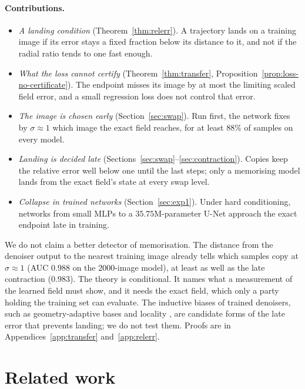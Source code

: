 \documentclass{article} %
\theoremstyle{plain}
\theoremstyle{definition}
\theoremstyle{remark}
\begin{document}
\paragraph{Contributions.}
\begin{itemize}\itemsep1pt
\item \emph{A landing condition} (Theorem~\ref{thm:relerr}). A trajectory lands on a training image
  if its error stays a fixed fraction below its distance to it, and not if the radial ratio tends
  to one fast enough.
\item \emph{What the loss cannot certify} (Theorem~\ref{thm:transfer},
  Proposition~\ref{prop:loss-no-certificate}). The endpoint misses its image by at most the
  limiting scaled field error, and a small regression loss does not control that error.
\item \emph{The image is chosen early} (Section~\ref{sec:swap}). Run first, the network fixes by
  $\sigma\approx1$ which image the exact field reaches, for at least $88\%$ of samples on every model.
\item \emph{Landing is decided late} (Sections~\ref{sec:swap}--\ref{sec:contraction}). Copies keep
  the relative error well below one until the last steps; only a memorising model lands from the
  exact field's state at every swap level.
\item \emph{Collapse in trained networks} (Section~\ref{sec:exp1}). Under hard conditioning, networks
  from small MLPs to a $35.75$M-parameter U-Net approach the exact endpoint late in training.
\end{itemize}
We do not claim a better detector of memorisation. The distance from the denoiser output to the
nearest training image already tells which samples copy at $\sigma\approx1$ (AUC $0.988$ on the
$2000$-image model), at least as well as the late contraction ($0.983$). The theory is conditional.
It names what a measurement of the learned field must show, and it needs the exact field, which only
a party holding the training set can evaluate. The inductive biases of trained denoisers, such as
geometry-adaptive bases \citep{kadkhodaie2024generalization} and locality
\citep{kamb2024creativity,niedoba2024mechanistic}, are candidate forms of the late error that
prevents landing; we do not test them. Proofs are in Appendices~\ref{app:transfer}
and~\ref{app:relerr}.

\section{Related work}
\label{sec:related}
\end{document}
